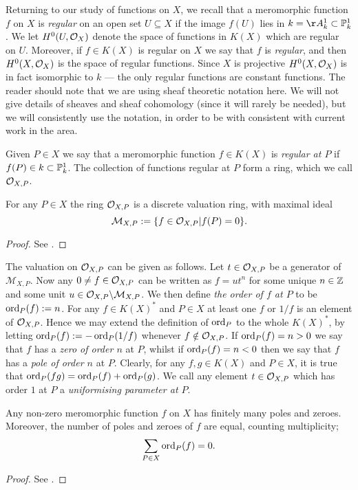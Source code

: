 Returning to our study of functions on $X$, we recall that a meromorphic function $f$ on $X$ is \emph{regular} on an open set $U \subseteq X$ if the image $f(U)$ lies in $k = \AA_k^1 \subset \PP_k^1$.
We let $H^0(U,{\cal O}_X)$ denote the space of functions in $K(X)$ which are regular on $U$.
Moreover, if $f \in K(X)$ is regular on $X$ we say that $f$ is \emph{regular}, and then $H^0(X,{\cal O}_X)$ is the space of regular functions.
Since $X$ is projective $H^0(X,{\cal O}_X)$ is in fact isomorphic to $k$ --- \ie the only regular functions are constant functions.
The reader should note that we are using sheaf theoretic notation here. 
We will not give details of sheaves and sheaf cohomology (since it will rarely be needed), but we will consistently use the notation, in order to be with consistent with current work in the area.

Given $P \in X$ we say that a meromorphic function $f \in K(X)$ is \emph{regular at $P$} if $f(P) \in k \subset {\mathbb P}_k^1$.
The collection of functions regular at $P$ form a ring, which we call ${\cal O}_{X,P}$.

    \begin{lem}
    For any $P \in X$ the ring ${\cal O}_{X,P}$ is a discrete valuation ring, with maximal ideal
        \[
        \mathcal {M}_{X,P} := \{ f \in {\cal O}_{X,P} | f(P) = 0 \}.
        \]
    \end{lem}
    \begin{proof}
    See \cite[Chap.\ 1, \S 4]{fulton}.
    \end{proof}

The valuation on ${\cal O}_{X,P}$ can be given as follows.
Let $t \in {\cal O}_{X,P}$ be a generator of $\mathcal{M}_{X,P}$.
Now any $0 \neq f \in {\cal O}_{X,P}$ can be written as $f = ut^n$ for some unique $n \in {\mathbb Z}$ and some unit $u \in {\cal O}_{X,P}\backslash \mathcal{M}_{X,P}$.
We then define \emph{the order of $f$ at $P$} to be $\operatorname{ord}_P(f) := n$.
For any $f \in K(X)^*$ and $P \in X$ at least one $f$ or $1/f$ is an element of $ {\cal O}_{X,P}$.
Hence we may extend the definition of $\operatorname{ord}_P$ to the whole $K(X)^*$, by letting $\operatorname{ord}_P(f) := - \operatorname{ord}_P(1/f)$ whenever $f \notin {\cal O}_{X,P}$.
If $\operatorname{ord}_P(f) = n >0$ we say that $f$ has a \emph{zero of order $n$} at $P$, whilst if $\operatorname{ord}_P(f) = n < 0$ then we say that $f$ has a \emph{pole of order $n$} at $P$.
Clearly, for any $f, g \in K(X)$ and $P \in X$, it is true that $\operatorname{ord}_P(fg) = \operatorname{ord}_P(f) + \operatorname{ord}_P(g)$.
We call any element $t \in {\cal O}_{X,P}$ which has order $1$ at $P$ a \emph{uniformising parameter at $P$}.

    \begin{prop}\label{propfinitelymanyzeroesandpoles}
    Any non-zero meromorphic function $f$ on $X$ has finitely many poles and zeroes.
    Moreover, the number of poles and zeroes of $f$ are equal, counting multiplicity; \ie 
        \[
        \sum_{P \in X} \operatorname{ord}_P(f) = 0.
        \]
    \end{prop}
    \begin{proof}
    See \cite[Chap.\ 8, \S 1, Prop.\ 1]{fulton}.
    \end{proof}



